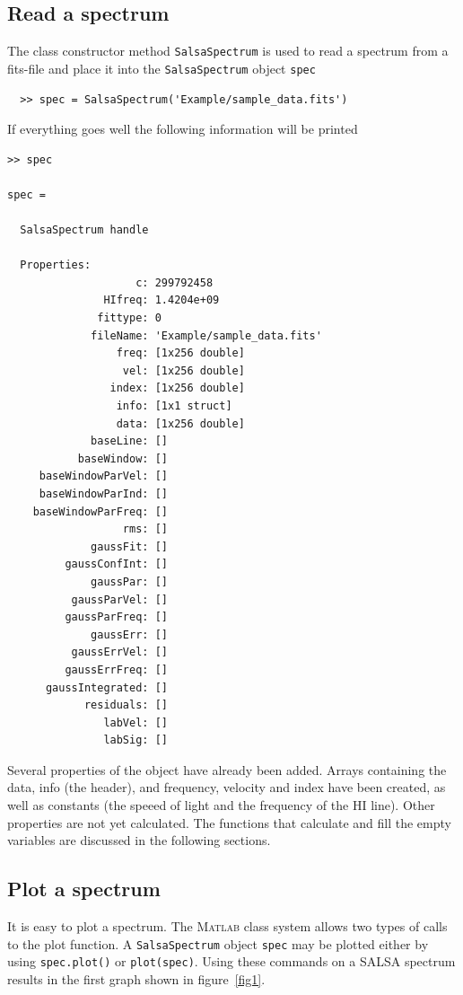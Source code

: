 \documentclass[11pt,a4paper]{article}
\begin{document}
\subsection{Read a spectrum}
\label{readaspectrum}

The class constructor method \texttt{SalsaSpectrum} is used to read a
spectrum from a fits-file and place it into the \texttt{SalsaSpectrum}
object \texttt{spec}

\begin{lstlisting}
  >> spec = SalsaSpectrum('Example/sample_data.fits')
\end{lstlisting}
If everything goes well the following information will be printed 
\begin{lstlisting}
>> spec

spec = 

  SalsaSpectrum handle

  Properties:
                    c: 299792458
               HIfreq: 1.4204e+09
              fittype: 0
             fileName: 'Example/sample_data.fits'
                 freq: [1x256 double]
                  vel: [1x256 double]
                index: [1x256 double]
                 info: [1x1 struct]
                 data: [1x256 double]
             baseLine: []
           baseWindow: []
     baseWindowParVel: []
     baseWindowParInd: []
    baseWindowParFreq: []
                  rms: []
             gaussFit: []
         gaussConfInt: []
             gaussPar: []
          gaussParVel: []
         gaussParFreq: []
             gaussErr: []
          gaussErrVel: []
         gaussErrFreq: []
      gaussIntegrated: []
            residuals: []
               labVel: []
               labSig: []
\end{lstlisting}

\noindent
Several properties of the object have already been added. Arrays
containing the data, info (the header), and frequency, velocity and
index have been created, as well as constants (the speeed of light and
the frequency of the HI line). Other properties are not yet
calculated. The functions that calculate and fill the empty variables are
discussed in the following sections.

\subsection{Plot a spectrum}
\label{sec:plot-spectrum}

It is easy to plot a spectrum. The \textsc{Matlab} class system allows two
types of calls to the plot function. A \texttt{SalsaSpectrum} object
\lstinline!spec! may be plotted either by using
\lstinline!spec.plot()! or \lstinline!plot(spec)!. Using these
commands on a SALSA spectrum results in the first graph shown in figure~\ref{fig1}.
\end{document}
